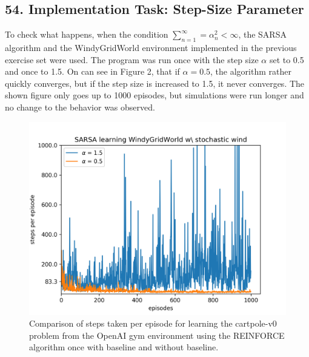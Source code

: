 \documentclass[10pt,a4paper]{article}
\begin{document}
\subsection*{54. Implementation Task: Step-Size Parameter}
To check what happens, when the condition $\sum_{n=1}^\infty = \alpha_n^2 < \infty$, the SARSA algorithm and the WindyGridWorld environment implemented in the previous exercise set were used. The program was run once with the step size $\alpha$ set to 0.5 and once to 1.5. On can see in Figure 2, that if $\alpha=0.5$, the algorithm rather quickly converges, but if the step size is increased to 1.5, it never converges. The shown figure only goes up to 1000 episodes, but simulations were run longer and no change to the behavior was observed.
\begin{figure}[H]
\centering
\captionsetup{width=.5\linewidth}
\includegraphics[width=.5\linewidth]{./WindyGridWorld_stochastic_wind.png}
\caption{Comparison of steps taken per episode for learning the cartpole-v0 problem from the OpenAI gym environment using the REINFORCE algorithm once with baseline and without baseline.}
\end{figure}
\end{document}
